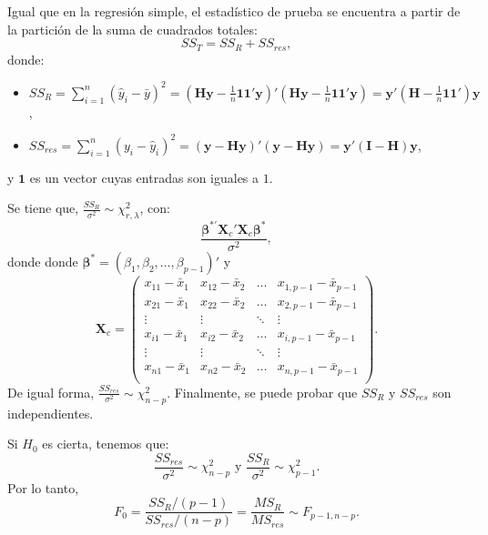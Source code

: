 \documentclass[
]{article}
\providecommand{\tightlist}{%
  \setlength{\itemsep}{0pt}\setlength{\parskip}{0pt}}
\begin{document}
Igual que en la regresión simple, el estadístico de prueba se encuentra a partir de la partición de la suma de cuadrados totales:
\[
SS_{T}  = SS_{R} + SS_{res},
\]
donde:

\begin{itemize}
\tightlist
\item
  \(SS_{R} = \sum_{i=1}^{n}(\widehat{y}_{i}-\bar{y})^{2} = (\boldsymbol H\boldsymbol y- \frac{1}{n}\boldsymbol 1\boldsymbol 1'\boldsymbol y)'(\boldsymbol H\boldsymbol y- \frac{1}{n}\boldsymbol 1\boldsymbol 1'\boldsymbol y)=\boldsymbol y'(\boldsymbol H- \frac{1}{n}\boldsymbol 1\boldsymbol 1')\boldsymbol y\),
\item
  \(SS_{res} = \sum_{i=1}^{n}(y_{i}-\widehat{y}_{i})^{2} = (\boldsymbol y- \boldsymbol H\boldsymbol y)'(\boldsymbol y- \boldsymbol H\boldsymbol y)=\boldsymbol y'(\boldsymbol I-\boldsymbol H)\boldsymbol y\),
\end{itemize}

y \(\boldsymbol 1\) es un vector cuyas entradas son iguales a \(1\).

Se tiene que, \(\frac{SS_{R}}{\sigma^2} \sim \chi^2_{r,\lambda}\), con:
\[
\frac{\boldsymbol \beta^{*'}\boldsymbol X_{c}'\boldsymbol X_{c}\boldsymbol \beta^{*}}{\sigma^{2}},
\]
donde donde \(\boldsymbol \beta^{*} = (\beta_{1},\beta_{2},\ldots,\beta_{p-1})'\) y
\[
\boldsymbol X_{c} = \begin{pmatrix}
x_{11} - \bar{x}_{1} & x_{12} - \bar{x}_{2} & \ldots & x_{1,p-1} - \bar{x}_{p-1} \\ 
x_{21} - \bar{x}_{1} & x_{22} - \bar{x}_{2} & \ldots & x_{2,p-1} - \bar{x}_{p-1} \\ 
\vdots & \vdots & \ddots & \vdots \\
x_{i1} - \bar{x}_{1} & x_{i2} - \bar{x}_{2} & \ldots & x_{i,p-1} - \bar{x}_{p-1} \\ 
\vdots & \vdots & \ddots & \vdots \\
x_{n1} - \bar{x}_{1} & x_{n2} - \bar{x}_{2} & \ldots & x_{n,p-1} - \bar{x}_{p-1} \\ 
\end{pmatrix}.
\]
De igual forma, \(\frac{SS_{res}}{\sigma^2} \sim \chi^2_{n-p}\). Finalmente, se puede probar que \(SS_{R}\) y \(SS_{res}\) son independientes.

Si \(H_{0}\) es cierta, tenemos que:
\[
\frac{SS_{res}}{\sigma^{2}}\sim\chi^{2}_{n-p} \mbox{ y } \frac{SS_{R}}{\sigma^{2}} \sim \chi^{2}_{p-1}.
\]
Por lo tanto,
\[
F_{0} = \frac{SS_{R}/(p-1)}{SS_{res}/(n-p)} = \frac{MS_{R}}{MS_{res}} \sim F_{p-1,n-p}.
\]
\end{document}
